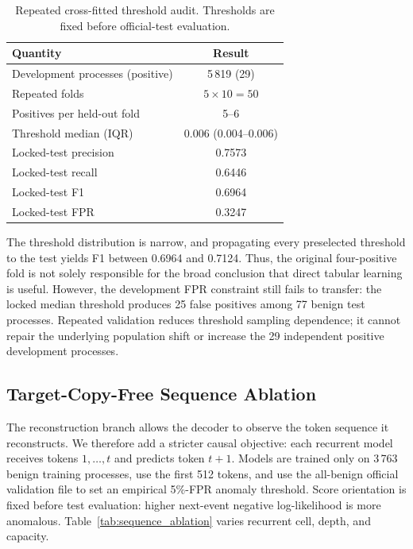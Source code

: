 \documentclass[10pt,journal,compsoc]{IEEEtran}
\begin{document}
\begin{table}[t]
\centering
\caption{Repeated cross-fitted threshold audit. Thresholds are fixed before official-test evaluation.}
\label{tab:repeated_threshold}
\begin{tabular}{lc}
\toprule
\textbf{Quantity} & \textbf{Result} \\
\midrule
Development processes (positive) & 5\,819 (29) \\
Repeated folds & $5\times10=50$ \\
Positives per held-out fold & 5--6 \\
Threshold median (IQR) & 0.006 (0.004--0.006) \\
Locked-test precision & 0.7573 \\
Locked-test recall & 0.6446 \\
Locked-test F1 & 0.6964 \\
Locked-test FPR & 0.3247 \\
\bottomrule
\end{tabular}
\end{table}

The threshold distribution is narrow, and propagating every preselected threshold to the test yields F1 between 0.6964 and 0.7124. Thus, the original four-positive fold is not solely responsible for the broad conclusion that direct tabular learning is useful. However, the development FPR constraint still fails to transfer: the locked median threshold produces 25 false positives among 77 benign test processes. Repeated validation reduces threshold sampling dependence; it cannot repair the underlying population shift or increase the 29 independent positive development processes.

\subsection{Target-Copy-Free Sequence Ablation}
\label{sec:sequence_ablation}

The reconstruction branch allows the decoder to observe the token sequence it reconstructs. We therefore add a stricter causal objective: each recurrent model receives tokens $1,\ldots,t$ and predicts token $t+1$. Models are trained only on 3\,763 benign training processes, use the first 512 tokens, and use the all-benign official validation file to set an empirical 5\%-FPR anomaly threshold. Score orientation is fixed before test evaluation: higher next-event negative log-likelihood is more anomalous. Table~\ref{tab:sequence_ablation} varies recurrent cell, depth, and capacity.
\end{document}
